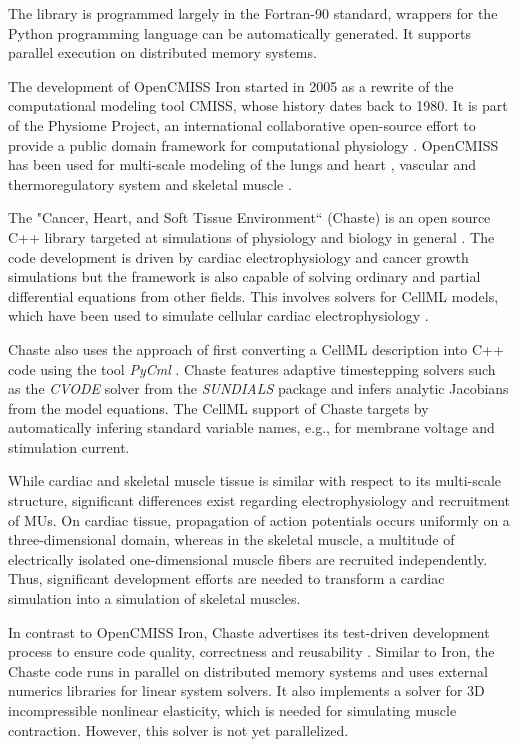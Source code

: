 The library is programmed largely in the Fortran-90 standard, wrappers for the Python programming language can be automatically generated. It supports parallel execution on distributed memory systems.

The development of OpenCMISS Iron started in 2005 as a rewrite of the computational modeling tool CMISS, whose history dates back to 1980. It is part of the Physiome Project, an international collaborative open-source effort to provide a public domain framework for computational physiology \cite{Hunter2004}.
OpenCMISS has been used for multi-scale modeling of the lungs and heart \cite{smith2004multiscale}, vascular and thermoregulatory system \cite{ladd2016open,ghadam2020modeling} and skeletal muscle \cite{Heidlauf2013}. 

The "Cancer, Heart, and Soft Tissue Environment`` (Chaste) is an open source C++ library targeted at simulations of physiology and biology in general \cite{Chaste2013}. The code development is driven by cardiac electrophysiology and cancer growth simulations but the framework is also capable of solving ordinary and partial differential equations from other fields. This involves solvers for CellML models, which have been used to simulate cellular cardiac electrophysiology \cite{ChasteCellML2015}.

Chaste \cite{ChasteCellML2015} also uses the approach of first converting a CellML description into C++ code using the tool \emph{PyCml} \cite{Cooper2006}. Chaste features adaptive timestepping solvers such as the \emph{CVODE} solver from the \emph{SUNDIALS} package \cite{cohen1996cvode} and infers analytic Jacobians from the model equations. The CellML support of Chaste targets  by automatically infering standard variable names, e.g., for membrane voltage and stimulation current.

While cardiac and skeletal muscle tissue is similar with respect to its multi-scale structure, significant differences exist regarding electrophysiology and recruitment of MUs. On cardiac tissue, propagation of action potentials occurs uniformly on a three-dimensional domain, whereas in the skeletal muscle, a multitude of electrically isolated one-dimensional muscle fibers are recruited independently.
Thus, significant development efforts are needed to transform a cardiac simulation into a simulation of skeletal muscles.

In contrast to OpenCMISS Iron, Chaste advertises its test-driven development process to ensure code quality, correctness and reusability \cite{Chaste2009}. Similar to Iron, the Chaste code runs in parallel on distributed memory systems and uses external numerics libraries for linear system solvers.
It also implements a solver for 3D incompressible nonlinear elasticity, which is needed for simulating muscle contraction. However, this solver is not yet parallelized.

